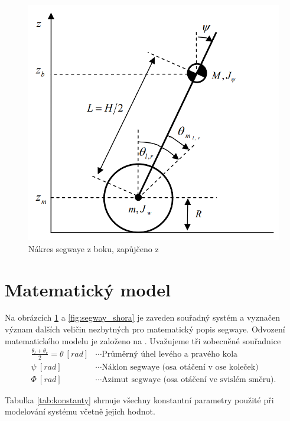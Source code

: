 \documentclass[conference]{IEEEtran}
\begin{document}
\begin{figure}[htbp]
    \centerline{\includegraphics[width=0.9\linewidth]{segway_bok.png}}
    \caption{Nákres segwaye z boku, zapůjčeno z \cite{model_based_design}}
    \label{fig:segway_bok}        
\end{figure}

\section{Matematický model}
Na obrázcích \ref{fig:segway_bok} a \ref{fig:segway_shora} je zaveden souřadný systém a vyznačen význam dalších veličin
nezbytných pro matematický popis segwaye. Odvození matematického modelu je založeno na \cite{model_based_design}.
Uvažujeme tři zobecněné souřadnice
\begin{equation*}
    \begin{split}
        \frac{\theta_l + \theta_r}{2} = \theta~ [\si{rad}] &\cdots \text{Průměrný úhel levého a pravého kola} \\
        \psi ~[\si{rad}] &\cdots \text{Náklon segwaye (osa otáčení v ose koleček)} \\
        \varPhi~[\si{rad}] &\cdots \text{Azimut segwaye (osa otáčení ve svislém směru).}
    \end{split}
\end{equation*}

Tabulka \ref{tab:konstanty} shrnuje všechny konstantní parametry použité při modelování systému včetně jejich hodnot.
\end{document}
